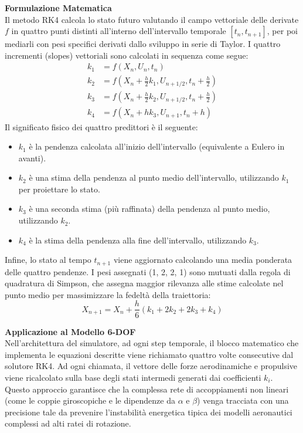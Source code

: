 \textbf{Formulazione Matematica}\\
Il metodo RK4 calcola lo stato futuro valutando il campo vettoriale delle derivate $f$ in quattro punti distinti all'interno dell'intervallo temporale $[t_n, t_{n+1}]$, per poi mediarli con pesi specifici derivati dallo sviluppo in serie di Taylor. I quattro incrementi (slopes) vettoriali sono calcolati in sequenza come segue:
\begin{align}
k_1 &= f(X_n, U_n, t_n) \\
k_2 &= f\left(X_n + \frac{h}{2}k_1, U_{n+1/2}, t_n + \frac{h}{2}\right) \\
k_3 &= f\left(X_n + \frac{h}{2}k_2, U_{n+1/2}, t_n + \frac{h}{2}\right) \\
k_4 &= f(X_n + h k_3, U_{n+1}, t_n + h)
\end{align}
Il significato fisico dei quattro predittori è il seguente:
\begin{itemize}
    \item $k_1$ è la pendenza calcolata all'inizio dell'intervallo (equivalente a Eulero in avanti).
    \item $k_2$ è una stima della pendenza al punto medio dell'intervallo, utilizzando $k_1$ per proiettare lo stato.
    \item $k_3$ è una seconda stima (più raffinata) della pendenza al punto medio, utilizzando $k_2$.
    \item $k_4$ è la stima della pendenza alla fine dell'intervallo, utilizzando $k_3$.
\end{itemize}
Infine, lo stato al tempo $t_{n+1}$ viene aggiornato calcolando una media ponderata delle quattro pendenze. I pesi assegnati (1, 2, 2, 1) sono mutuati dalla regola di quadratura di Simpson, che assegna maggior rilevanza alle stime calcolate nel punto medio per massimizzare la fedeltà della traiettoria:
\begin{equation}
X_{n+1} = X_n + \frac{h}{6}(k_1 + 2k_2 + 2k_3 + k_4)
\end{equation}

\textbf{Applicazione al Modello 6-DOF}\\
Nell'architettura del simulatore, ad ogni step temporale, il blocco matematico che implementa le equazioni descritte viene richiamato quattro volte consecutive dal solutore RK4. Ad ogni chiamata, il vettore delle forze aerodinamiche e propulsive viene ricalcolato sulla base degli stati intermedi generati dai coefficienti $k_i$. Questo approccio garantisce che la complessa rete di accoppiamenti non lineari (come le coppie giroscopiche e le dipendenze da $\alpha$ e $\beta$) venga tracciata con una precisione tale da prevenire l'instabilità energetica tipica dei modelli aeronautici complessi ad alti ratei di rotazione.\cite{stevens2015aircraft}

